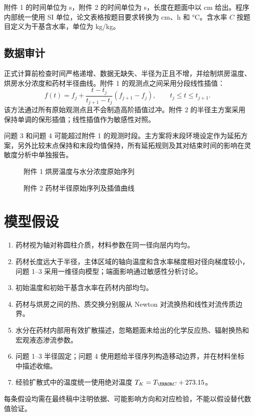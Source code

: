 \documentclass[UTF8,a4paper,11pt]{ctexart}
\newcommand{\figplaceholder}[2]{\begin{figure}[H]\centering\fbox{\parbox[c][#2][c]{0.82\linewidth}{\centering\textcolor{gray}{待由 MATLAB 图表包回填：#1}}}\caption{#1}\end{figure}}
\begin{document}
附件 1 的时间单位为 s，附件 2 的时间单位为 s，长度在题面中以 cm 给出。程序内部统一使用 SI 单位，论文表格按题目要求转换为 cm、h 和 \si{\degreeCelsius}。含水率 $C$ 按题目定义为干基含水率，单位为 \si{kg/kg}。

\subsection{数据审计}

正式计算前检查时间严格递增、数据无缺失、半径为正且不增，并绘制烘房温度、烘房水分浓度和药材半径曲线。附件 1 的观测点之间采用分段线性插值：
\begin{equation}
f(t)=f_j+\frac{t-t_j}{t_{j+1}-t_j}(f_{j+1}-f_j),\qquad t_j\le t\le t_{j+1}.
\end{equation}
该方法通过所有原始观测点且不会制造高阶插值过冲。附件 2 的半径主方案采用保持单调的保形插值；线性插值作为敏感性对照。

问题 3 和问题 4 可能超过附件 1 的观测时段。主方案将末段环境设定作为延拓方案，另外比较末点保持和末段均值保持，所有延拓规则及其对结束时间的影响在灵敏度分析中单独报告。

\figplaceholder{附件 1 烘房温度与水分浓度原始序列}{5cm}
\figplaceholder{附件 2 药材半径原始序列及插值曲线}{5cm}

\section{模型假设}

\begin{enumerate}
  \item 药材视为轴对称圆柱介质，材料参数在同一径向层内均匀。
  \item 药材长度远大于半径，主体区域的轴向温度和含水率梯度相对径向梯度较小，问题 1--3 采用一维径向模型；端面影响通过敏感性分析讨论。
  \item 初始温度和初始干基含水率在药材内部均匀。
  \item 药材与烘房之间的热、质交换分别服从 Newton 对流换热和线性对流传质边界。
  \item 水分在药材内部用有效扩散描述，忽略题面未给出的化学反应热、辐射换热和宏观液态渗流参数。
  \item 问题 1--3 半径固定；问题 4 使用题给半径序列构造移动边界，并在材料坐标中描述收缩。
  \item 经验扩散式中的温度统一使用绝对温度 $T_K=T_{\degree C}+273.15$。
\end{enumerate}

每条假设均需在最终稿中注明依据、可能影响方向和对应检验，不能以假设替代数值验证。
\end{document}
